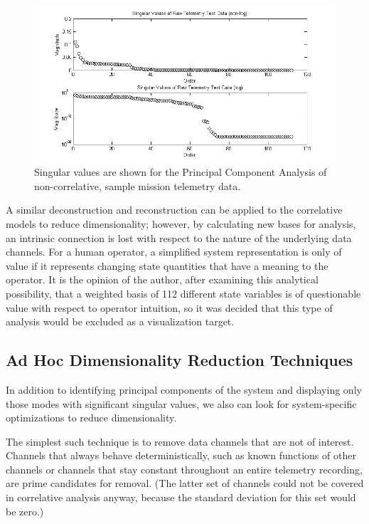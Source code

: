 \begin{figure}[h]
\centering
    \includegraphics[width=\columnwidth]{images/raw_telem_svs.png}
    \caption{Singular values are shown for the Principal Component Analysis of non-correlative, sample mission telemetry data.}
    \label{fig:raw_telem_svs}
\end{figure}

A similar deconstruction and reconstruction can be applied to the correlative models to reduce dimensionality; however, by calculating new bases for analysis, an intrinsic connection is lost with respect to the nature of the underlying data channels. For a human operator, a simplified system representation is only of value if it represents changing state quantities that have a meaning to the operator. It is the opinion of the author, after examining this analytical possibility, that a weighted basis of 112 different state variables is of questionable value with respect to operator intuition, so it was decided that this type of analysis would be excluded as a visualization target.

\subsection{Ad Hoc Dimensionality Reduction Techniques}

In addition to identifying principal components of the system and displaying only those modes with significant singular values, we also can look for system-specific optimizations to reduce dimensionality.

The simplest such technique is to remove data channels that are not of interest. Channels that always behave deterministically, such as known functions of other channels or channels that stay constant throughout an entire telemetry recording, are prime candidates for removal. (The latter set of channels could not be covered in correlative analysis anyway, because the  standard deviation for this set would be zero.)

